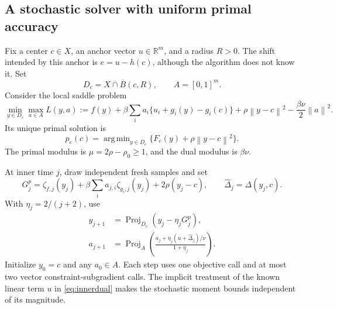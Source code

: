 \documentclass[11pt,a4paper]{article}
\newcommand{\R}{\mathbb R}
\newcommand{\norm}[1]{\left\lVert#1\right\rVert}
\DeclareMathOperator{\Proj}{Proj}
\DeclareMathOperator*{\argmin}{arg\,min}
\theoremstyle{remark}
\numberwithin{equation}{section}
\begin{document}
\subsection{A stochastic solver with uniform primal accuracy}
Fix a center $c\in X$, an anchor vector $u\in\R^m$, and a radius $R>0$. The shift intended by this anchor is $e=u-h(c)$, although the algorithm does not know it. Set
\[
 D_c=X\cap\overline B(c,R),\qquad A=[0,1]^m.
\]
Consider the local saddle problem
\begin{equation}
 \min_{y\in D_c}\max_{a\in A}
 L(y,a):=f(y)+\beta\sum_i a_i\{u_i+g_i(y)-g_i(c)\}
 +\rho\norm{y-c}^2-\frac{\beta\nu}{2}\norm a^2.
 \label{eq:localsaddle}
\end{equation}
Its unique primal solution is
\[
 p_e(c)=\argmin_{y\in D_c}\{F_e(y)+\rho\norm{y-c}^2\}.
\]
The primal modulus is $\mu=2\rho-\rho_0\ge1$, and the dual modulus is $\beta\nu$.

At inner time $j$, draw independent fresh samples and set
\[
 G^p_j=\zeta_{f,j}(y_j)+\beta\sum_i a_{j,i}\zeta_{g_i,j}(y_j)+2\rho(y_j-c),
 \qquad \widehat\Delta_j=\Delta(y_j,c).
\]
With $\eta_j=2/(j+2)$, use
\begin{align}
 y_{j+1}&=\Proj_{D_c}(y_j-\eta_jG^p_j),\label{eq:innerprimal}\\
 a_{j+1}&=\Proj_A\left(\frac{a_j+\eta_j(u+\widehat\Delta_j)/\nu}{1+\eta_j}\right).
 \label{eq:innerdual}
\end{align}
Initialize $y_0=c$ and any $a_0\in A$. Each step uses one objective call and at most two vector constraint-subgradient calls. The implicit treatment of the known linear term $u$ in \eqref{eq:innerdual} makes the stochastic moment bounds independent of its magnitude.
\end{document}
